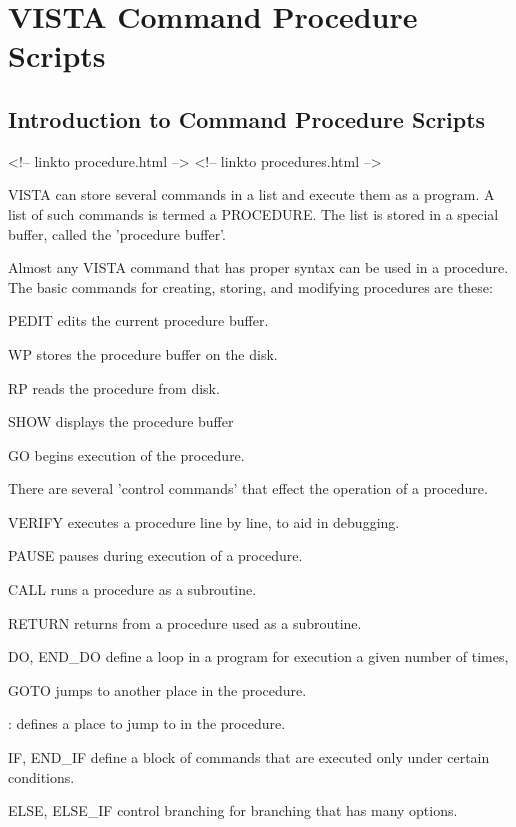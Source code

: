\chapter{VISTA Command Procedure Scripts}

%
%

\section{Introduction to Command Procedure Scripts}
\begin{rawhtml}
<!-- linkto procedure.html -->
<!-- linkto procedures.html -->
\end{rawhtml}


VISTA can store several commands in a list and execute them as a program.
A list of such commands is termed a PROCEDURE.  The list is stored in a
special buffer, called the 'procedure buffer'.

Almost any VISTA command that has proper syntax can be used in a procedure.
The basic commands for creating, storing, and modifying procedures are
these:
\begin{example}
  \item[PEDIT\hfill]{edits the current procedure buffer.}
  \item[WP\hfill]{stores the procedure buffer on the disk.}
  \item[RP\hfill]{reads the procedure from disk.}
  \item[SHOW\hfill]{displays the procedure buffer}
  \item[GO\hfill]{begins execution of the procedure.}
\end{example}

There are several 'control commands' that effect the operation of a
procedure.
\begin{example}
  \item[VERIFY\hfill]{executes a procedure line by line, to aid in debugging.}
  \item[PAUSE\hfill]{pauses during execution of a procedure.}
  \item[CALL\hfill]{runs a procedure as a subroutine.}
  \item[RETURN\hfill]{returns from a procedure used as a subroutine.}
  \item[DO, END\_DO\hfill]{define a loop in a program for execution a given
       number of times,}
  \item[GOTO\hfill]{jumps to another place in the procedure.}
  \item[:\hfill]{defines a place to jump to in the procedure.}
  \item[IF, END\_IF \hfill]{define a block of commands that are executed
       only under certain conditions.}
  \item[ELSE, ELSE\_IF\hfill]{control branching for branching that has many
       options.}
\end{example}


